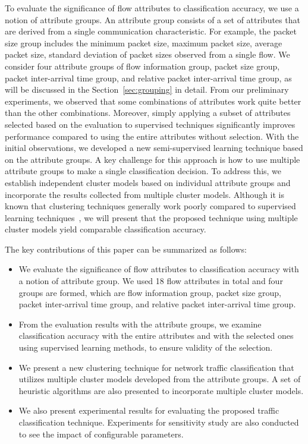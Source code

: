 \documentclass[conference]{IEEEtran}
\begin{document}
To evaluate the significance of flow attributes to classification accuracy, we use a notion of attribute groups.
An attribute group consists of a set of attributes that are derived from a single communication characteristic.
For example, the packet size group includes the minimum packet size, maximum packet size, average packet size, standard deviation of packet sizes observed from a single flow.
We consider four attribute groups of flow information group, packet size group, packet inter-arrival time group, and relative packet inter-arrival time group, as will be discussed in the Section~\ref{sec:grouping} in detail.
From our preliminary experiments, we observed that some combinations of attributes work quite better than the other combinations.
Moreover, simply applying a subset of attributes selected based on the evaluation to supervised techniques significantly improves performance compared to using the entire attributes without selection.
With the initial observations, we developed a new semi-supervised learning technique based on the attribute groups.
A key challenge for this approach is how to use multiple attribute groups to make a single classification decision.
To address this, we establish independent cluster models based on individual attribute groups and incorporate the results collected from multiple cluster models. 
Although it is known that clustering techniques generally work poorly compared to supervised learning techniques~\cite{DBLP:conf/infocom/XieIKFN12}, we will present that the proposed technique using multiple cluster models yield comparable classification accuracy.

The key contributions of this paper can be summarized as follows:

\begin{itemize}
	\item We evaluate the significance of flow attributes to classification accuracy with a notion of attribute group.
	We used 18 flow attributes in total and four groups are formed, which are flow information group, packet size group, packet inter-arrival time group, and relative packet inter-arrival time group.
	\item From the evaluation results with the attribute groups, we examine classification accuracy with the entire attributes and with the selected ones using supervised learning methods, to ensure  validity of the selection. 
	\item We present a new clustering technique for network traffic classification that utilizes multiple cluster models developed from the attribute groups. A set of heuristic algorithms are also presented to incorporate multiple cluster models.
	\item We also present experimental results for evaluating the proposed traffic classification technique. Experiments for sensitivity study are also conducted to see the impact of configurable parameters.
\end{itemize}
\end{document}
